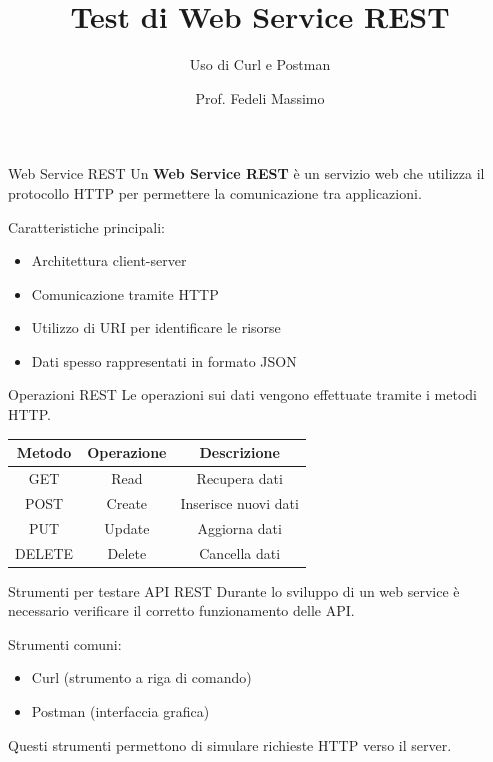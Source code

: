 \documentclass{beamer}
\title{Test di Web Service REST}
\subtitle{Uso di Curl e Postman}
\author{Prof. Fedeli Massimo }
\date{}
\begin{document}
	
	\frame{\titlepage}
	
	
	\begin{frame}{Web Service REST}
		Un \textbf{Web Service REST} è un servizio web che utilizza il protocollo HTTP per permettere la comunicazione tra applicazioni.
		
		\bigskip
		
		Caratteristiche principali:
		
		\begin{itemize}
			\item Architettura client-server
			\item Comunicazione tramite HTTP
			\item Utilizzo di URI per identificare le risorse
			\item Dati spesso rappresentati in formato JSON
		\end{itemize}
		
	\end{frame}
	
	
	\begin{frame}{Operazioni REST}
		Le operazioni sui dati vengono effettuate tramite i metodi HTTP.
		
		\bigskip
		
		\begin{center}
			\begin{tabular}{c c c}
				\textbf{Metodo} & \textbf{Operazione} & \textbf{Descrizione} \\
				\hline
				GET & Read & Recupera dati \\
				POST & Create & Inserisce nuovi dati \\
				PUT & Update & Aggiorna dati \\
				DELETE & Delete & Cancella dati
			\end{tabular}
		\end{center}
		
	\end{frame}
	
	
	\begin{frame}{Strumenti per testare API REST}
		Durante lo sviluppo di un web service è necessario verificare il corretto funzionamento delle API.
		
		\bigskip
		
		Strumenti comuni:
		
		\begin{itemize}
			\item Curl (strumento a riga di comando)
			\item Postman (interfaccia grafica)
		\end{itemize}
		
		\bigskip
		
		Questi strumenti permettono di simulare richieste HTTP verso il server.
		
	\end{frame}
	
\end{document}
